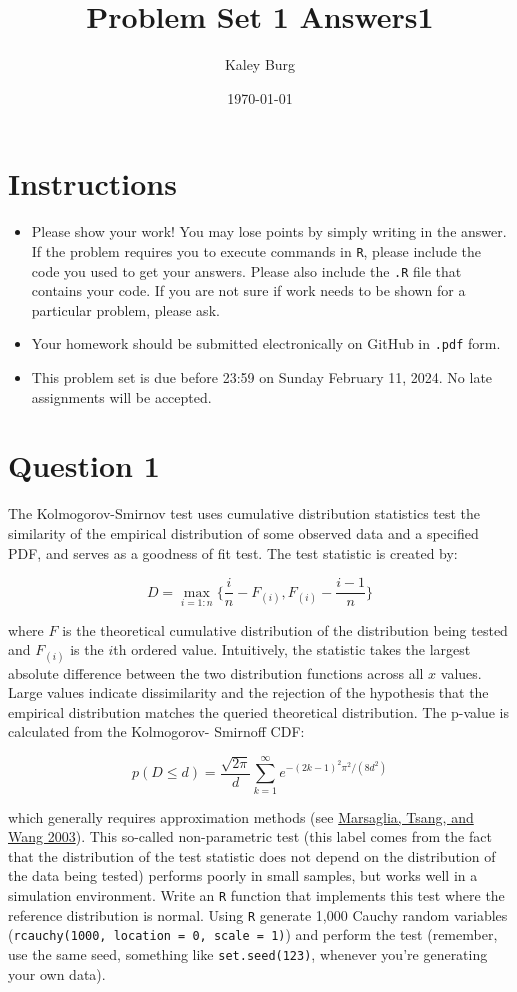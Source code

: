 \documentclass[12pt,letterpaper]{article}
\title{Problem Set 1 Answers1}
\date{\today}
\author{Kaley Burg}
\begin{document}
	\maketitle
	\section*{Instructions}
	\begin{itemize}
	\item Please show your work! You may lose points by simply writing in the answer. If the problem requires you to execute commands in \texttt{R}, please include the code you used to get your answers. Please also include the \texttt{.R} file that contains your code. If you are not sure if work needs to be shown for a particular problem, please ask.
\item Your homework should be submitted electronically on GitHub in \texttt{.pdf} form.
\item This problem set is due before 23:59 on Sunday February 11, 2024. No late assignments will be accepted.
	\end{itemize}

	\vspace{.25cm}
\section*{Question 1} 
\vspace{.25cm}
\noindent The Kolmogorov-Smirnov test uses cumulative distribution statistics test the similarity of the empirical distribution of some observed data and a specified PDF, and serves as a goodness of fit test. The test statistic is created by:

$$D = \max_{i=1:n} \Big\{ \frac{i}{n}  - F_{(i)}, F_{(i)} - \frac{i-1}{n} \Big\}$$

\noindent where $F$ is the theoretical cumulative distribution of the distribution being tested and $F_{(i)}$ is the $i$th ordered value. Intuitively, the statistic takes the largest absolute difference between the two distribution functions across all $x$ values. Large values indicate dissimilarity and the rejection of the hypothesis that the empirical distribution matches the queried theoretical distribution. The p-value is calculated from the Kolmogorov-
Smirnoff CDF:

$$p(D \leq d)= \frac{\sqrt {2\pi}}{d} \sum _{k=1}^{\infty }e^{-(2k-1)^{2}\pi ^{2}/(8d^{2})}$$


\noindent which generally requires approximation methods (see \href{https://core.ac.uk/download/pdf/25787785.pdf}{Marsaglia, Tsang, and Wang 2003}). This so-called non-parametric test (this label comes from the fact that the distribution of the test statistic does not depend on the distribution of the data being tested) performs poorly in small samples, but works well in a simulation environment. Write an \texttt{R} function that implements this test where the reference distribution is normal. Using \texttt{R} generate 1,000 Cauchy random variables (\texttt{rcauchy(1000, location = 0, scale = 1)}) and perform the test (remember, use the same seed, something like \texttt{set.seed(123)}, whenever you're generating your own data).\\
	
\end{document}
